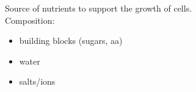 Source of nutrients to support the growth of cells. \\
Composition:
\begin{itemize} 
    \item building blocks (sugars, aa)
    \item water
    \item salts/ions
\end{itemize}
